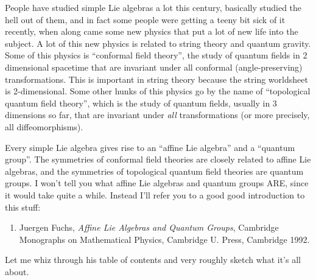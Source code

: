 \documentclass{article}
\def\tightlist{}
\begin{document}
People have studied simple Lie algebras a lot this century, basically
studied the hell out of them, and in fact some people were getting a
teeny bit sick of it recently, when along came some new physics that put
a lot of new life into the subject. A lot of this new physics is related
to string theory and quantum gravity. Some of this physics is
``conformal field theory'', the study of quantum fields in 2 dimensional
spacetime that are invariant under all conformal (angle-preserving)
transformations. This is important in string theory because the string
worldsheet is 2-dimensional. Some other hunks of this physics go by the
name of ``topological quantum field theory'', which is the study of
quantum fields, usually in 3 dimensions so far, that are invariant under
\emph{all} transformations (or more precisely, all diffeomorphisms).

Every simple Lie algebra gives rise to an ``affine Lie algebra'' and a
``quantum group''. The symmetries of conformal field theories are
closely related to affine Lie algebras, and the symmetries of
topological quantum field theories are quantum groups. I won't tell you
what affine Lie algebras and quantum groups ARE, since it would take
quite a while. Instead I'll refer you to a good good introduction to
this stuff:

\begin{enumerate}
\def\labelenumi{\arabic{enumi})}
\tightlist
\item
  Juergen Fuchs, \emph{Affine Lie Algebras and Quantum Groups},
  Cambridge Monographs on Mathematical Physics, Cambridge U. Press,
  Cambridge 1992.
\end{enumerate}

Let me whiz through his table of contents and very roughly sketch what
it's all about.
\end{document}
